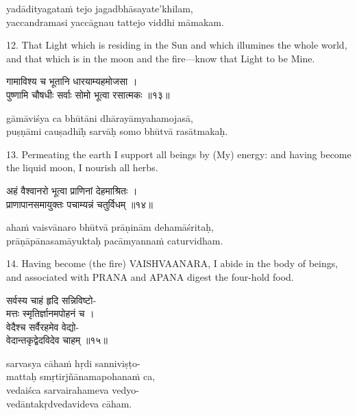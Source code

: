 \begin{transliteration}
yadādityagataṁ tejo jagadbhāsayate'khilam, \\
yaccandramasi yaccāgnau tattejo viddhi māmakam.
\end{transliteration}

12. That Light which is residing in the Sun and which illumines the whole
world, and that which is in the moon and the fire---know that Light to be Mine.

\begin{gitaverse}
गामाविश्य च भूतानि धारयाम्यहमोजसा । \\
पुष्णामि चौषधीः सर्वाः सोमो भूत्वा रसात्मकः ॥१३॥
\end{gitaverse}

\begin{transliteration}
gāmāviśya ca bhūtāni dhārayāmyahamojasā, \\
puṣṇāmi cauṣadhīḥ sarvāḥ somo bhūtvā rasātmakaḥ.
\end{transliteration}

13. Permeating the earth I support all beings by (My) energy: and having become
the liquid moon, I nourish all herbs.

\begin{gitaverse}
अहं वैश्वानरो भूत्वा प्राणिनां देहमाश्रितः । \\
प्राणापानसमायुक्तः पचाम्यन्नं चतुर्विधम् ॥१४॥
\end{gitaverse}

\begin{transliteration}
ahaṁ vaisvānaro bhūtvā prāṇinām dehamāśritaḥ, \\
prāṇāpānasamāyuktaḥ pacāmyannaṁ caturvidham.
\end{transliteration}

14. Having become (the fire) VAISHVAANARA, I abide in the body of beings, and
associated with PRANA and APANA digest the four-hold food.

\begin{gitaverse}
सर्वस्य चाहं हृदि सन्निविष्टो- \\
\tab मत्तः स्मृतिर्ज्ञानमपोहनं च । \\
वेदैश्च सर्वैरहमेव वेद्यो- \\
\tab वेदान्तकृद्वेदविदेव चाहम् ॥१५॥
\end{gitaverse}

\begin{transliteration}
sarvasya cāhaṁ hṛdi sanniviṣṭo- \\
\tab mattaḥ smṛtirjñānamapohanaṁ ca, \\
vedaiśca sarvairahameva vedyo- \\
\tab vedāntakṛdvedavideva cāham.
\end{transliteration}

